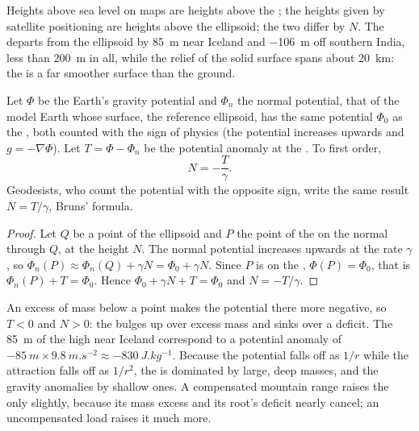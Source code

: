 Heights above sea level on maps are heights above the ; the heights given
by satellite positioning are heights above the ellipsoid; the two differ by
$N$. The  departs from the ellipsoid by \qty{+85}{m} near Iceland and
\qty{-106}{m} off southern India, less than \qty{200}{m} in all, while the relief
of the solid surface spans about \qty{20}{km}: the  is a far smoother
surface than the ground.

\begin{proposition}\label{prop:b1:isostasy-gravity:bruns}
Let $\Phi$ be the Earth's gravity potential and $\Phi_n$ the normal potential,
that of the model Earth whose surface, the reference ellipsoid, has the same
potential $\Phi_0$ as the , both counted with the sign of physics (the
potential increases upwards and $g = -\nabla\Phi$). Let $T = \Phi - \Phi_n$ be the
potential anomaly at the . To first order,
\[
  N = -\frac{T}{\gamma} .
\]
Geodesists, who count the potential with the opposite sign, write the same
result $N = T/\gamma$, Bruns' formula.
\end{proposition}

\begin{proof}
Let $Q$ be a point of the ellipsoid and $P$ the point of the  on the
normal through $Q$, at the height $N$. The normal potential increases upwards
at the rate $\gamma$, so $\Phi_n(P) \approx \Phi_n(Q) + \gamma N = \Phi_0 +
\gamma N$. Since $P$ is on the , $\Phi(P) = \Phi_0$, that is
$\Phi_n(P) + T = \Phi_0$. Hence $\Phi_0 + \gamma N + T = \Phi_0$ and $N =
-T/\gamma$.
\end{proof}

An excess of mass below a point makes the potential there more negative, so
$T < 0$ and $N > 0$: the  bulges up over excess mass and sinks over a
deficit. The \qty{85}{m} of the high near Iceland correspond to a potential
anomaly of $-\qty{85}{m}\times\qty{9.8}{m.s^{-2}} \approx \qty{-830}{J.kg^{-1}}$.
Because the potential falls off as $1/r$ while the attraction falls off as $1/r^2$,
the  is dominated by large, deep masses, and the gravity anomalies by
shallow ones. A compensated mountain range raises the  only slightly,
because its mass excess and its root's deficit nearly cancel; an
uncompensated load raises it much more.

